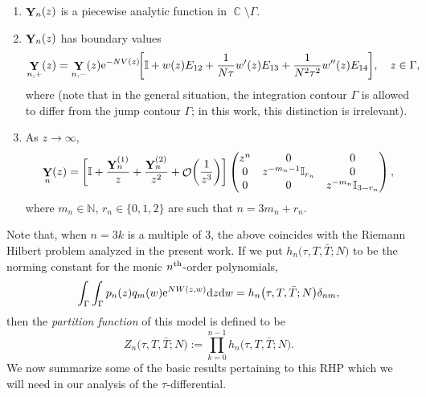 \documentclass[pdftex]{sigma}
\DeclareMathOperator{\CC}{\mathbb{C}}
\DeclareMathOperator{\OO}{\mathcal{O}}
\DeclareMathOperator{\YY}{{\bf Y}}
\numberwithin{equation}{section}
\begin{document}
 \begin{enumerate}\itemsep=0pt
 \item[$(1)$] $\YY_{n}(z)$ is a piecewise analytic function in $\CC\setminus \Gamma$.
 \item[$(2)$] $\YY_n(z)$ has boundary values
 \begin{gather*}
 \YY_{n,+}(z) = \YY_{n,-}(z) {\rm e}^{-NV(z)}\!\biggl[ \mathbb{I} + w(z)E_{12} + \frac{1}{N\tau} w'(z)E_{13} + \frac{1}{N^2\tau^2} w''(z)E_{14} \biggr],\quad z\in \Gamma,
 \end{gather*}
 where  (note that in the general situation, the integration contour $\Gamma$ is allowed to differ from the jump contour $\Gamma$; in this work, this distinction is irrelevant).
 \item[$(3)$] As $z\to \infty$,
 \begin{gather*}
 \YY_n(z) = \biggl[\mathbb{I} + \frac{\YY_{n}^{(1)}}{z} + \frac{\YY_{n}^{(2)}}{z^2} + \OO\biggl(\frac{1}{z^3}\biggr)\biggr]
 \begin{pmatrix}
 z^n & 0 & 0\\
 0 & z^{-m_n - 1}\mathbb{I}_{r_n} & 0\\
 0 & 0 & z^{-m_n}\mathbb{I}_{3-r_n}\\
 \end{pmatrix},
 \end{gather*}
 where $m_n\in \mathbb{N}$, $r_n \in \{0,1,2\}$ are such that $n = 3 m_n + r_n$.
 \end{enumerate}
Note that, when $n = 3k$ is a multiple of $3$, the above coincides with the Riemann Hilbert problem analyzed in the present work.
If we put $h_n\bigl(\tau,T,\bar{T};N\bigr)$ to be the norming constant for the monic $n^{\rm th}$-order polynomials,
 \begin{equation*}
 \int_{\Gamma}\int_{\Gamma} p_n(z)q_m(w) {\rm e}^{N W(z,w)}{\rm d}z{\rm d}w = h_n\bigl(\tau,T,\bar{T};N\bigr)\delta_{nm},
 \end{equation*}
then the \textit{partition function} of this model is defined to be
 \begin{equation*}
 Z_n\bigl(\tau,T,\bar{T};N\bigr) := \prod_{k=0}^{n-1}h_n\bigl(\tau,T,\bar{T};N\bigr).
 \end{equation*}
We now summarize some of the basic results pertaining to this RHP which we will need in our analysis of the $\tau$-differential.
\end{document}
